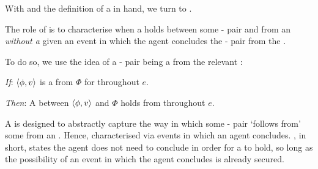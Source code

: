 \begin{note}
  With \supportI{} and the definition of a \pwitP{} in hand, we turn to \supportII{}.

  The role of \supportII{} is to characterise when a \ros{} holds between some - pair and \pool{} from an \agpe{} \emph{without a} given an event in which the agent concludes the - pair from the \pool{}.

  To do so, we use the idea of a - pair being a \fc{} from the relevant \pool{}:

  \begin{idea}[\supportII{}]%
    \label{idea:support:possible}%
    \vspace{-\baselineskip}
    \begin{itenum}
    \item[\emph{If}:]
      \(\langle \phi, v \rangle\) is a  from \(\Phi\) for \vAgent{} throughout \(e\).
    \item[\emph{Then}:]
      A \ros{} between \(\langle \phi, v \rangle\) and \(\Phi\) holds from  throughout \(e\).
    \end{itenum}
    \vspace{-\baselineskip}
  \end{idea}

  \noindent%
  A \ros{} is designed to abstractly capture the way in which some - pair `follows from' some \pool{} from an \agpe{}.
  Hence, \supportI{} characterised  via events in which an agent concludes.
  \supportII{}, in short, states the agent does not need to conclude in order for a \ros{} to hold, so long as the possibility of an event in which the agent concludes is already secured.
\end{note}

